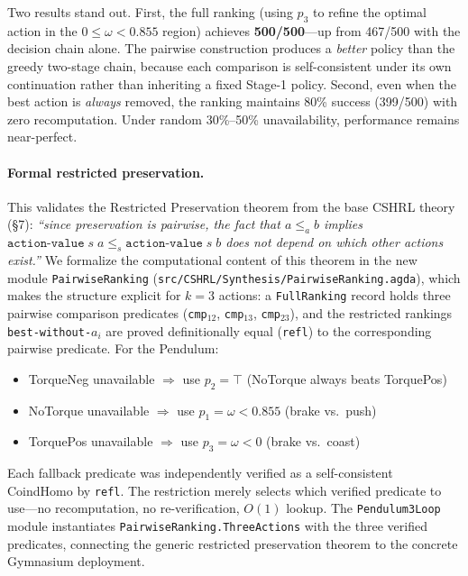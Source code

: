 \documentclass[9pt,a4paper]{article}
\newcommand{\fpath}[1]{\nolinkurl{#1}}
\theoremstyle{plain}
\theoremstyle{definition}
\theoremstyle{remark}
\begin{document}
\noindent Two results stand out.  First, the full ranking (using $p_3$ to refine the optimal action in the $0 \leq \omega < 0.855$ region) achieves \textbf{500/500}---up from 467/500 with the decision chain alone.  The pairwise construction produces a \emph{better} policy than the greedy two-stage chain, because each comparison is self-consistent under its own continuation rather than inheriting a fixed Stage-1 policy.  Second, even when the best action is \emph{always} removed, the ranking maintains 80\% success (399/500) with zero recomputation.  Under random 30\%--50\% unavailability, performance remains near-perfect.

\paragraph{Formal restricted preservation.}
This validates the Restricted Preservation theorem from the base CSHRL theory~\cite{CSHRL2026} (\S7): \emph{``since preservation is pairwise, the fact that $a \leq_a b$ implies $\texttt{action-value}\;s\;a \leq_s \texttt{action-value}\;s\;b$ does not depend on which other actions exist.''}  We formalize the computational content of this theorem in the new module \texttt{PairwiseRanking} (\fpath{src/CSHRL/Synthesis/PairwiseRanking.agda}), which makes the structure explicit for $k=3$ actions: a \texttt{FullRanking} record holds three pairwise comparison predicates (\texttt{cmp$_{12}$}, \texttt{cmp$_{13}$}, \texttt{cmp$_{23}$}), and the restricted rankings \texttt{best-without-$a_i$} are proved definitionally equal (\texttt{refl}) to the corresponding pairwise predicate.  For the Pendulum:
\begin{itemize}
\item TorqueNeg unavailable $\Rightarrow$ use $p_2 = \top$ (NoTorque always beats TorquePos)
\item NoTorque unavailable $\Rightarrow$ use $p_1 = \omega < 0.855$ (brake vs.\ push)
\item TorquePos unavailable $\Rightarrow$ use $p_3 = \omega < 0$ (brake vs.\ coast)
\end{itemize}

\noindent Each fallback predicate was independently verified as a self-consistent CoindHomo by \texttt{refl}.  The restriction merely selects which verified predicate to use---no recomputation, no re-verification, $O(1)$ lookup.  The \texttt{Pendulum3Loop} module instantiates \texttt{PairwiseRanking.ThreeActions} with the three verified predicates, connecting the generic restricted preservation theorem to the concrete Gymnasium deployment.
\end{document}
